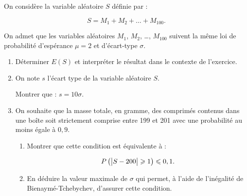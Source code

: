 \smallskip

On considère la variable aléatoire $S$ définie par : 

\[ S= M_1+ M_2+ \ldots+ M_{100}.\]

On admet que les variables aléatoires $M_1$,\: $M_2$,\: \ldots,\: $M_{100}$ suivent la même loi de probabilité d'espérance $\mu = 2$ et d'écart-type $\sigma$.

\begin{enumerate}
	\item Déterminer $E(S)$ et interpréter le résultat dans le contexte de l'exercice.
	\item On note $s$ l'écart type de la variable aléatoire $S$.
	
Montrer que : $s = 10\sigma$.
	\item On souhaite que la masse totale, en gramme, des comprimés contenus dans une boîte
	soit strictement comprise entre 199 et 201 avec une probabilité au moins égale à $0,9$.
	\begin{enumerate}
		\item Montrer que cette condition est équivalente à : 
		
		\[P \left ( \left |S-200 \strut \right | \geqslant 1 \right ) \leqslant 0,1.\]
		
		\item En déduire la valeur maximale de $\sigma$ qui permet, à l'aide de l'inégalité de Bienaymé­-Tchebychev, d'assurer cette condition. 
	\end{enumerate}
\end{enumerate}
